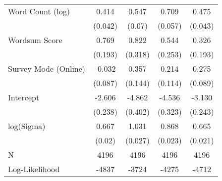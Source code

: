 \begin{table}[ht]
\begin{tabular}{lcccc}
  Word Count (log) &  0.414 &  0.547 &  0.709 &  0.475 \\ 
   & (0.042) & (0.07) & (0.057) & (0.043) \\ 
  Wordsum Score &  0.769 &  0.822 &  0.544 &  0.326 \\ 
   & (0.193) & (0.318) & (0.253) & (0.193) \\ 
  Survey Mode (Online) & -0.032 &  0.357 &  0.214 &  0.275 \\ 
   & (0.087) & (0.144) & (0.114) & (0.089) \\ 
  Intercept & -2.606 & -4.862 & -4.536 & -3.130 \\ 
   & (0.238) & (0.402) & (0.323) & (0.243) \\ 
  log(Sigma) &  0.667 &  1.031 &  0.868 &  0.665 \\ 
   & (0.02) & (0.027) & (0.023) & (0.021) \\ 
   \hline
N & 4196 & 4196 & 4196 & 4196 \\ 
  Log-Likelihood & -4837 & -3724 & -4275 & -4712 \\ 
   \hline
\end{tabular}
\endgroup
\end{table}
